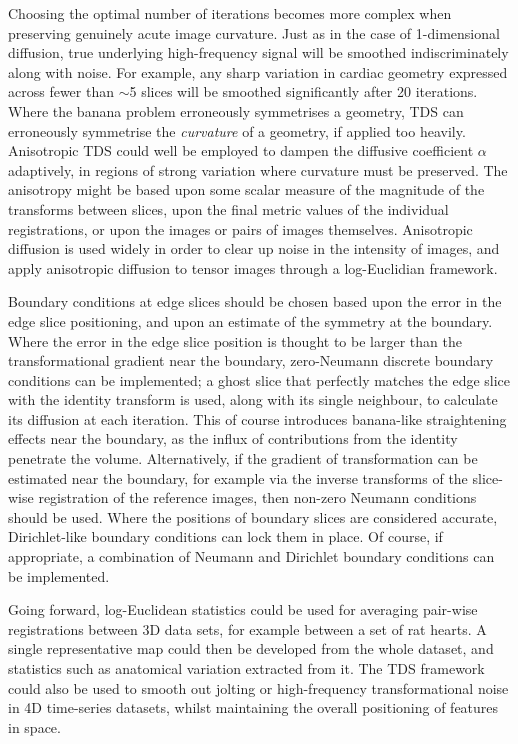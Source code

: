   Choosing the optimal number of iterations becomes more complex when preserving genuinely acute image curvature. Just as in the case of 1-dimensional diffusion, true underlying high-frequency signal will be smoothed indiscriminately along with noise. For example, any sharp variation in cardiac geometry expressed across fewer than $\sim$5 slices will be smoothed significantly after 20 iterations. Where the banana problem erroneously symmetrises a geometry, TDS can erroneously symmetrise the \emph{curvature} of a geometry, if applied too heavily. Anisotropic TDS could well be employed to dampen the diffusive coefficient $\alpha$ adaptively, in regions of strong variation where curvature must be preserved. The anisotropy might be based upon some scalar measure of the magnitude of the transforms between slices, upon the final metric values of the individual registrations, or upon the images or pairs of images themselves. Anisotropic diffusion is used widely in order to clear up noise in the intensity of images, and ~\cite{Arsigny2005} apply anisotropic diffusion to tensor images through a log-Euclidian framework.
  
  Boundary conditions at edge slices should be chosen based upon the error in the edge slice positioning, and upon an estimate of the symmetry at the boundary. Where the error in the edge slice position is thought to be larger than the transformational gradient near the boundary, zero-Neumann discrete boundary conditions can be implemented; a ghost slice that perfectly matches the edge slice with the identity transform is used, along with its single neighbour, to calculate its diffusion at each iteration. This of course introduces banana-like straightening effects near the boundary, as the influx of contributions from the identity penetrate the volume. Alternatively, if the gradient of transformation can be estimated near the boundary, for example via the inverse transforms of the slice-wise registration of the reference images, then non-zero Neumann conditions should be used. Where the positions of boundary slices are considered accurate, Dirichlet-like boundary conditions can lock them in place. Of course, if appropriate, a combination of Neumann and Dirichlet boundary conditions can be implemented.
  
  Going forward, log-Euclidean statistics could be used for averaging pair-wise registrations between 3D data sets, for example between a set of rat hearts. A single representative map could then be developed from the whole dataset, and statistics such as anatomical variation extracted from it. The TDS framework could also be used to smooth out jolting or high-frequency transformational noise in 4D time-series datasets, whilst maintaining the overall positioning of features in space.  
